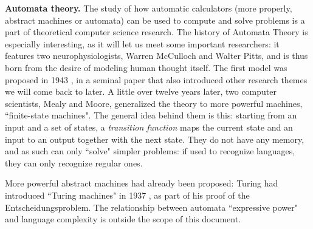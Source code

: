 \documentclass[../main.tex]{subfiles}
\begin{document}
\vspace{4pt}
\textbf{Automata theory.}
The study of how automatic calculators (more properly, abstract machines or automata) can be used to compute and solve problems is a part of theoretical computer science research. The history of Automata Theory is especially interesting, as it will let us meet some important researchers: it features two neurophysiologists, Warren McCulloch and Walter Pitts, and is thus born from the desire of modeling human thought itself. The first model was proposed in 1943  \parencite{mccullochLogicalCalculusIdeas1943}, in a seminal paper that also introduced other research themes we will come back to later. A little over twelve years later, two computer scientists, Mealy and Moore, generalized the theory to more powerful machines, ``finite-state machines". The general idea behind them is this: starting from an input and a set of states, a \textit{transition function} maps the current state and an input to an output together with the next state. They do not have any memory, and as such can only ``solve" simpler problems: if used to recognize languages, they can only recognize regular ones.

More powerful abstract machines had already been proposed: Turing had introduced ``Turing machines" in 1937  \parencite{turingComputableNumbersApplication1937}, as part of his proof of the Entscheidungsproblem. The relationship between automata ``expressive power" and language complexity is outside the scope of this document.
\end{document}
